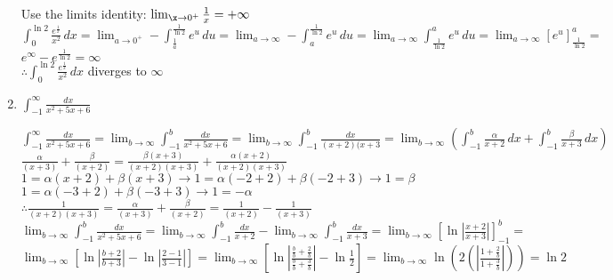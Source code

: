 \documentclass[10pt, letterpaper]{report}
\begin{document}
\begin{enumerate}
    Use the limits identity: $\lim_{\x\to 0^{+}}\frac{1}{x}=+\infty$ \\
    
    $\int_{0}^{\ln{2}}{\frac{e^{\frac{1}{x}}}{x^{2}}}\,dx=
    \lim_{a\to 0^{+}}-\int_{\frac{1}{a}}^{\frac{1}{\ln{2}}}{e^{u}}\,du=
    \lim_{a\to\infty}-\int_{a}^{\frac{1}{\ln{2}}}{e^{u}}\,du=
    \lim_{a\to\infty}\int_{\frac{1}{\ln{2}}}^{a}{e^{u}}\,du=
    \lim_{a\to\infty}[e^{u}]_{\frac{1}{\ln{2}}}^{a}=$ \\
    
    $e^{\infty}-e^{\frac{1}{\ln{2}}}=\infty $ \\
    
    $\therefore \int_{0}^{\ln{2}}{\frac{e^{\frac{1}{x}}}{x^{2}}}\,dx$ diverges to $\infty$ \\
    
  \item{$\int_{-1}^{\infty}{\frac{dx}{x^{2}+5x+6}}$ \\}
  
    $\int_{-1}^{\infty}{\frac{dx}{x^{2}+5x+6}}=
    \lim_{b\to\infty}\int_{-1}^{b}{\frac{dx}{x^{2}+5x+6}}=
    \lim_{b\to\infty}\int_{-1}^{b}{\frac{dx}{(x+2)(x+3}}=
    \lim_{b\to\infty}\left(\int_{-1}^{b}{\frac{\alpha}{x+2}}\,dx+\int_{-1}^{b}{\frac{\beta}{x+3}}\,dx\right)$ \\
  
    $\frac{\alpha}{(x+3)}+\frac{\beta}{(x+2)}=\frac{\beta(x+3)}{(x+2)(x+3)}+\frac{\alpha(x+2)}{(x+2)(x+3)}$ \\
    
    $1=\alpha(x+2)+\beta(x+3)\rightarrow 1=\alpha(-2+2)+\beta(-2+3)\rightarrow 1=\beta$ \\
    
    $1=\alpha(-3+2)+\beta(-3+3)\rightarrow 1=-\alpha$ \\
    
    $\therefore \frac{1}{(x+2)(x+3)}=\frac{\alpha}{(x+3)}+\frac{\beta}{(x+2)}=\frac{1}{(x+2)}-\frac{1}{(x+3)}$ \\
    
    $\lim_{b\to\infty}\int_{-1}^{b}{\frac{dx}{x^{2}+5x+6}}=
    \lim_{b\to\infty}\int_{-1}^{b}{\frac{dx}{x+2}}-\lim_{b\to\infty}\int_{-1}^{b}{\frac{dx}{x+3}}=
    \lim_{b\to\infty}\left[\ln{\left|\frac{x+2}{x+3}\right|}\right]_{-1}^{b}=$ \\
    
    $\lim_{b\to\infty}\left[\ln{\left|\frac{b+2}{b+3}\right|}-\ln{\left|\frac{2-1}{3-1}\right|}\right]=
    \lim_{b\to\infty}\left[\ln{\left|\frac{\frac{b}{b}+\frac{2}{b}}{\frac{b}{b}+\frac{3}{b}}\right|}-\ln{\frac{1}{2}}\right]=
    \lim_{b\to\infty}\ln{\left(2\left(\left|\frac{1+\frac{2}{b}}{1+\frac{3}{b}}\right|\right)\right)}=
    \ln{2}$ \\
    

\end{enumerate}
\end{document}
